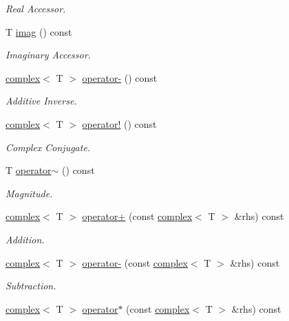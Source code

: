 \begin{DoxyCompactItemize}
\begin{DoxyCompactList}\small\item\em Real Accessor. \end{DoxyCompactList}\item 
T \hyperlink{classcomplex_a4edf203a6e7005a5d6817473d703a423}{imag} () const
\begin{DoxyCompactList}\small\item\em Imaginary Accessor. \end{DoxyCompactList}\item 
\hyperlink{classcomplex}{complex}$<$ T $>$ \hyperlink{classcomplex_abef23308534cc50484e7d154a8497dbc}{operator-\/} () const
\begin{DoxyCompactList}\small\item\em Additive Inverse. \end{DoxyCompactList}\item 
\hyperlink{classcomplex}{complex}$<$ T $>$ \hyperlink{classcomplex_a0a6eb0b21f6f7d0084c7edc637e98e10}{operator!} () const
\begin{DoxyCompactList}\small\item\em Complex Conjugate. \end{DoxyCompactList}\item 
T \hyperlink{classcomplex_a53710ae99345025cc52a6ecc1804cb8d}{operator$\sim$} () const
\begin{DoxyCompactList}\small\item\em Magnitude. \end{DoxyCompactList}\item 
\hyperlink{classcomplex}{complex}$<$ T $>$ \hyperlink{classcomplex_aa10f3dbe0731c90d1b15408e3f11ae52}{operator+} (const \hyperlink{classcomplex}{complex}$<$ T $>$ \&rhs) const
\begin{DoxyCompactList}\small\item\em Addition. \end{DoxyCompactList}\item 
\hyperlink{classcomplex}{complex}$<$ T $>$ \hyperlink{classcomplex_a7f61f4a380f418de039d1f65946424ef}{operator-\/} (const \hyperlink{classcomplex}{complex}$<$ T $>$ \&rhs) const
\begin{DoxyCompactList}\small\item\em Subtraction. \end{DoxyCompactList}\item 
\hyperlink{classcomplex}{complex}$<$ T $>$ \hyperlink{classcomplex_ad2f08f4f8eea0ef2def536898addd7f3}{operator$\ast$} (const \hyperlink{classcomplex}{complex}$<$ T $>$ \&rhs) const

\end{DoxyCompactItemize}
